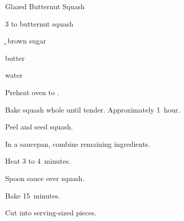 \begin{recipe}{Glazed Butternut Squash}{}{}

\begin{ingredients}
\item 3 to  butternut squash
\item \c{\half} brown sugar
\item \C{\quarter} butter
\item {} water
\end{ingredients}

\begin{directions}
\item Preheat oven to .
\item Bake squash whole until tender. Approximately 1~hour.
\item Peel and seed squash.
\item In a saucepan, combine remaining ingredients.
\item Heat 3 to 4~minutes.
\item Spoon sauce over squash.
\item Bake 15~minutes.
\item Cut into serving-sized pieces.
\end{directions}

\end{recipe}
